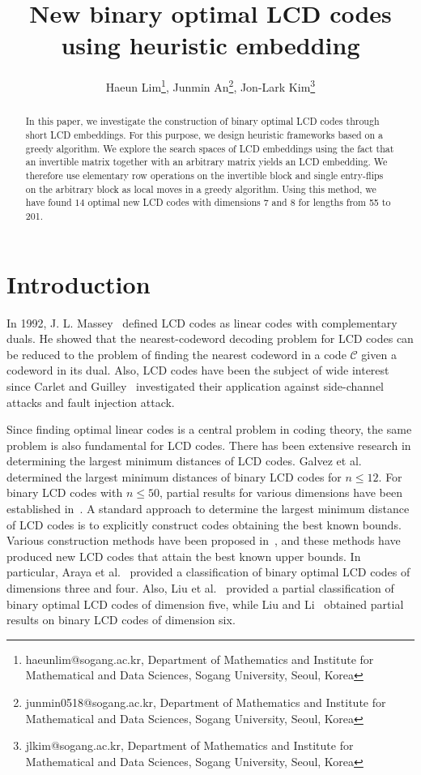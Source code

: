 \documentclass{article}
\title{New binary optimal LCD codes using heuristic embedding}
\author{Haeun Lim\thanks{haeunlim@sogang.ac.kr, Department of Mathematics and Institute for Mathematical and Data Sciences, Sogang University, Seoul, Korea}, Junmin An\thanks{junmin0518@sogang.ac.kr, Department of Mathematics and Institute for Mathematical and Data Sciences, Sogang University, Seoul, Korea}, Jon-Lark Kim\thanks{jlkim@sogang.ac.kr, Department of Mathematics and Institute for Mathematical and Data Sciences, Sogang University, Seoul, Korea}}
\date{}
\theoremstyle{definition}
\theoremstyle{remark}
\begin{document}
\maketitle

\begin{abstract}
    In this paper, we investigate the construction of binary optimal LCD codes through short LCD embeddings. For this purpose, we design heuristic frameworks based on a greedy algorithm. We explore the search spaces of LCD embeddings using the fact that an invertible matrix together with an arbitrary matrix yields an LCD embedding. We therefore use elementary row operations on the invertible block and single entry-flips on the arbitrary block as local moves in a greedy algorithm. Using this method, we have found $14$ optimal new LCD codes with dimensions 7 and 8 for lengths from 55 to 201.
\end{abstract}

\section{Introduction}
In 1992, J. L. Massey~\cite{M-1992} defined LCD codes as linear codes with complementary duals. He showed that the nearest-codeword decoding problem for LCD codes can be reduced to the problem of finding the nearest codeword in a code $\mathcal{C}$ given a codeword in its dual. Also, LCD codes have been the subject of wide interest since Carlet and Guilley~\cite{CG-2015} investigated their application against side-channel attacks and fault injection attack.

Since finding optimal linear codes is a central problem in coding theory, the same problem is also fundamental for LCD codes. There has been extensive research in determining the largest minimum distances of LCD codes. Galvez et al.~\cite{GKLRW-2018} determined the largest minimum distances of binary LCD codes for $n\le 12$. For binary LCD codes with $n\le 50$, partial results for various dimensions have been established in~\cite{AH-2020,B-2021,HS-2019,IS-2023,LSL-2024,WLL-2024}. A standard approach to determine the largest minimum distance of LCD codes is to explicitly construct codes obtaining the best known bounds. Various construction methods have been proposed in~\cite{B-2021,HS-2019,IS-2023,K-2023,LSL-2024,WLL-2024}, and these methods have produced new LCD codes that attain the best known upper bounds. In particular, Araya et al.~\cite{AHS-2021} provided a classification of binary optimal LCD codes of dimensions three and four. Also, Liu et al.~\cite{LLFS-2024} provided a partial classification of binary optimal LCD codes of dimension five, while Liu and Li~\cite{LL-2024} obtained partial results on binary LCD codes of dimension six.
\end{document}
